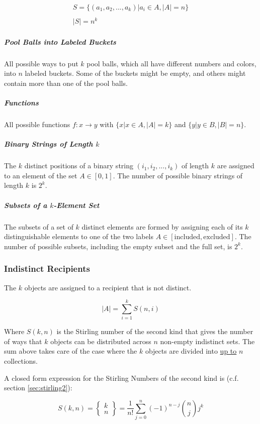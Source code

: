\begin{equation}	
\begin{array}{l}
S = \{ (a_1,a_2,...,a_k) | a_i \in A, |A| = n \}\\
\\
|S| = n^k
\end{array}
\end{equation}



\subparagraph{Pool Balls into Labeled Buckets} All possible ways to put $k$ pool balls, which all have different numbers and colors, into $n$ labeled buckets. Some of the buckets might be empty, and others might contain more than one of the pool balls.

\subparagraph{Functions} All possible functions $f:x \rightarrow y$ with $\{x | x\in A, |A| = k \}$ and $\{y | y\in B, |B| = n\}$.

\subparagraph{Binary Strings of Length $k$} The $k$ distinct positions of a binary string $(i_1,i_2,...,i_k)$ of length $k$ are assigned to an element of the set $A\in[0,1]$. The number of possible binary strings of length $k$ is $2^k$.

\subparagraph{Subsets of a $k$-Element Set} The subsets of a set of $k$ distinct elements are formed by assigning each of its $k$ distinguishable elements to one of the two labels $A\in [\mathrm{included},\mathrm{excluded}]$. The number of possible subsets, including the empty subset and the full set, is $2^k$.


\subsubsection{Indistinct Recipients}
The $k$ objects are assigned to a recipient that is not distinct. 

\begin{equation}
|A| = \sum_{i=1}^k S(n,i)
\end{equation}

Where $S(k,n)$ is the Stirling number of the second kind that gives the number of ways that $k$ objects can be distributed across $n$ non-empty indistinct sets. The sum above takes care of the case where the $k$ objects are divided into \underline{up to} $n$ collections.  

A closed form expression for the Stirling Numbers of the second kind is (c.f. section \ref{sec:stirling2}): 

\begin{equation}
S(k,n) = \left\{ \begin{array}{c} k \\n \end{array} \right\} = \frac{1}{n!}\sum_{j=0}^n (-1)^{n-j} {n \choose j }j^k
\label{eq:stirling2}
\end{equation}


